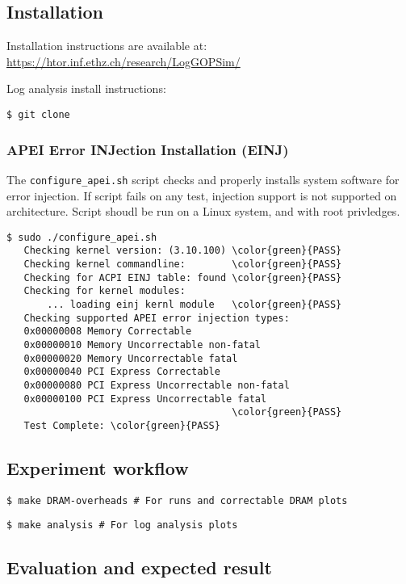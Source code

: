 \subsection{Installation}

Installation instructions are available at: \url{https://htor.inf.ethz.ch/research/LogGOPSim/}

Log analysis install instructions:

{\texttt{\$ git clone }}

\subsubsection{APEI Error INJection Installation (EINJ)}

The {\texttt{configure\_apei.sh}} script checks and properly installs system
software for error injection.  If script fails on any test, injection support is
not supported on architecture.  Script shoudl be run on a Linux system, and with
root privledges.

\begin{Verbatim}[commandchars=\\\{\}]
 $ sudo ./configure_apei.sh
   Checking kernel version: (3.10.100) \color{green}{PASS}
   Checking kernel commandline:        \color{green}{PASS}
   Checking for ACPI EINJ table: found \color{green}{PASS}
   Checking for kernel modules:
       ... loading einj kernl module   \color{green}{PASS}
   Checking supported APEI error injection types:
   0x00000008 Memory Correctable
   0x00000010 Memory Uncorrectable non-fatal
   0x00000020 Memory Uncorrectable fatal
   0x00000040 PCI Express Correctable
   0x00000080 PCI Express Uncorrectable non-fatal
   0x00000100 PCI Express Uncorrectable fatal
                                       \color{green}{PASS}
   Test Complete: \color{green}{PASS}

\end{Verbatim}

\subsection{Experiment workflow}

{\texttt{\$ make DRAM-overheads \# For \LogGOPSim runs and correctable DRAM plots}}

{\texttt{\$ make analysis \# For log analysis plots}}
\subsection{Evaluation and expected result}

